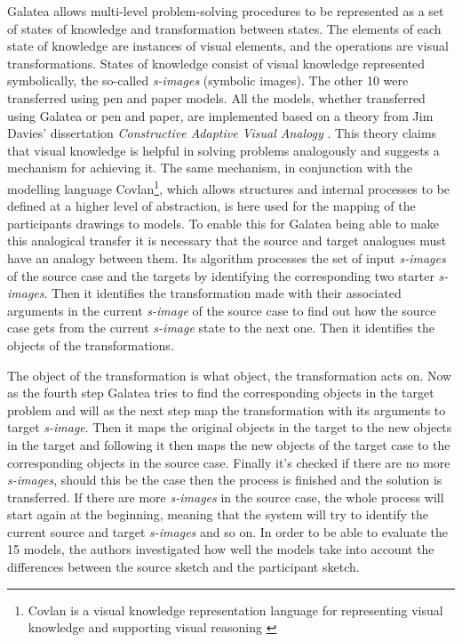 \documentclass[12pt]{article}
\begin{document}
Galatea allows multi-level problem-solving procedures to be represented as a set of states of knowledge and transformation between states. The elements of each state of knowledge are instances of visual elements, and the operations are visual transformations.  States of knowledge consist of visual knowledge represented symbolically, the so-called \textit{s-images} (symbolic images). 
The other 10 were transferred using pen and paper models. All the models, whether transferred using Galatea or pen and paper, are implemented based on a theory from Jim Davies' dissertation \textit{Constructive Adaptive Visual Analogy} \cite{davies2004constructive}. This theory claims that visual knowledge is helpful in solving problems analogously and suggests a mechanism for achieving it. The same mechanism, in conjunction with the modelling language Covlan\footnote{Covlan is a visual knowledge representation language for representing visual knowledge and supporting visual reasoning \cite{davies2007transfer}}, which allows structures and internal processes to be defined at a higher level of abstraction, is here used for the mapping of the participants drawings to models. To enable this for Galatea being able to make this analogical transfer it is necessary that the source and target analogues must have an analogy between them. Its algorithm processes the set of input \textit{s-images} of the source case and the targets by identifying the corresponding two starter \textit{s-images}. Then it identifies the transformation made with their associated arguments in the current \textit{s-image} of the source case to find out how the source case gets from the current \textit{s-image} state to the next one. Then it identifies the objects of the transformations. 

The object of the transformation is what object, the transformation acts on. Now as the fourth step Galatea tries to find the corresponding objects in the target problem and will as the next step map the transformation with its arguments to target \textit{s-image}. Then it maps the original objects in the target to the new objects in the target and following it then maps the new objects of the target case to the corresponding objects in the source case. Finally it's checked if there are no more \textit{s-images}, should this be the case then the process is finished and the solution is transferred. If there are more \textit{s-images} in the source case, the whole process will start again at the beginning, meaning that the system will try to identify the current source and target \textit{s-images} and so on. In order to be able to evaluate the 15 models, the authors investigated how well the models take into account the differences between the source sketch and the participant sketch. 
\end{document}
